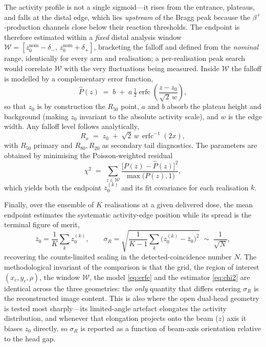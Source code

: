 \documentclass[11pt]{article}
\begin{document}
The activity profile is not a single sigmoid---it rises from the entrance,
plateaus, and falls at the distal edge, which lies \emph{upstream} of the Bragg
peak because the \(\beta^{+}\)-production channels close below their reaction
thresholds. The endpoint is therefore estimated within a \emph{fixed} distal
analysis window \(\mathcal{W}=[z_0^{\mathrm{nom}}-\delta_-,\,
z_0^{\mathrm{nom}}+\delta_+]\), bracketing the falloff and defined from the
\emph{nominal} range, identically for every arm and realisation; a
per-realisation peak search would correlate \(\mathcal{W}\) with the very
fluctuations being measured. Inside \(\mathcal{W}\) the falloff is modelled by a
complementary error function,
\begin{equation}
  \hat{P}(z) \;=\; b \;+\; a\,\tfrac{1}{2}
    \operatorname{erfc}\!\left(\frac{z-z_0}{\sqrt{2}\,w}\right),
  \label{eq:erfc}
\end{equation}
so that \(z_0\) is by construction the \(R_{50}\) point, \(a\) and \(b\) absorb
the plateau height and background (making \(z_0\) invariant to the absolute
activity scale), and \(w\) is the edge width. Any falloff level follows
analytically,
\begin{equation}
  R_x \;=\; z_0 \;+\; \sqrt{2}\,w\,\operatorname{erfc}^{-1}(2x),
  \label{eq:Rx}
\end{equation}
with \(R_{50}\) primary and \(R_{80},R_{20}\) as secondary tail diagnostics. The
parameters are obtained by minimising the Poisson-weighted residual
\begin{equation}
  \chi^{2} \;=\; \sum_{z\in\mathcal{W}}
    \frac{\bigl[P(z)-\hat{P}(z)\bigr]^{2}}{\max\!\bigl(P(z),1\bigr)},
  \label{eq:chi2}
\end{equation}
which yields both the endpoint \(z_0^{(k)}\) and its fit covariance for each
realisation \(k\).

Finally, over the ensemble of \(K\) realisations at a given delivered dose, the
mean endpoint estimates the systematic activity-edge position while its spread is
the terminal figure of merit,
\begin{equation}
  \bar{z}_0 = \frac{1}{K}\sum_{k} z_0^{(k)}, \qquad
  \sigma_R = \sqrt{\frac{1}{K-1}\sum_{k}\bigl(z_0^{(k)}-\bar{z}_0\bigr)^{2}}
           \;\sim\; \frac{1}{\sqrt{N}},
  \label{eq:sigmaR}
\end{equation}
recovering the counts-limited scaling in the detected-coincidence number \(N\).
The methodological invariant of the comparison is that the grid, the region of
interest \((x_c,y_c,\rho)\), the window \(\mathcal{W}\), the model
\eqref{eq:erfc} and the estimator \eqref{eq:chi2} are identical across the three
geometries: the \emph{only} quantity that differs entering \(\sigma_R\) is the
reconstructed image content. This is also where the open dual-head geometry is
tested most sharply---its limited-angle artefact elongates the activity
distribution, and whenever that elongation projects onto the beam ($z$) axis it
biases \(z_0\) directly, so \(\sigma_R\) is reported as a function of beam-axis
orientation relative to the head gap.
\end{document}
